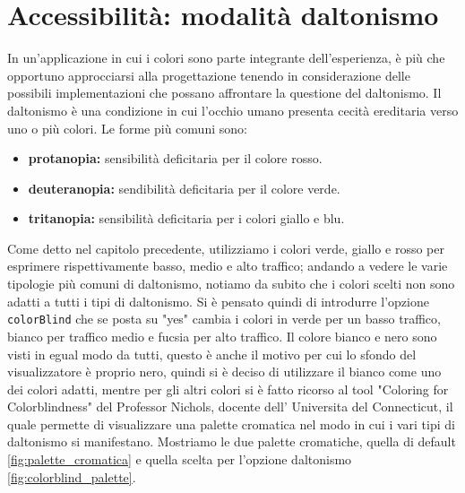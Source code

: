 \documentclass[binding=0.6cm]{sapthesis}
\begin{document}
\section{Accessibilità: modalità daltonismo}
In un'applicazione in cui i colori sono parte integrante dell'esperienza, è più che opportuno approcciarsi alla progettazione tenendo
in considerazione delle possibili implementazioni che possano affrontare la questione del daltonismo. 
Il daltonismo è una condizione in cui l'occhio umano presenta cecità ereditaria verso uno o più colori. Le forme più comuni sono:
\begin{itemize}
    \item \textbf{protanopia:} sensibilità deficitaria per il colore rosso.
    \item \textbf{deuteranopia:} sendibilità deficitaria per il colore verde.
    \item \textbf{tritanopia:} sensibilità deficitaria per i colori giallo e blu.
\end{itemize}
Come detto nel capitolo precedente, utilizziamo
i colori verde, giallo e rosso per esprimere rispettivamente basso, medio e alto traffico; andando a vedere le varie tipologie più comuni di daltonismo, 
notiamo da subito che i colori scelti non sono adatti a tutti i tipi di daltonismo. Si è pensato quindi di introdurre l'opzione
\lstinline|colorBlind| che se posta su "yes" cambia i colori in verde per un basso traffico, bianco per traffico medio e fucsia per alto traffico.
Il colore bianco e nero sono visti in egual modo da tutti, questo è anche il motivo per cui lo sfondo del visualizzatore è proprio nero, quindi si è
deciso di utilizzare il bianco come uno dei colori adatti, mentre per gli altri colori si è fatto ricorso al tool "Coloring for Colorblindness" \cite{ColorBlindPalette2024} 
del Professor Nichols, docente dell' Universita del Connecticut, il quale permette di visualizzare una palette cromatica nel modo in cui i vari tipi
di daltonismo si manifestano. Mostriamo le due palette cromatiche, quella di default \ref{fig:palette_cromatica} e quella scelta per l'opzione daltonismo \ref{fig:colorblind_palette}.
\end{document}
